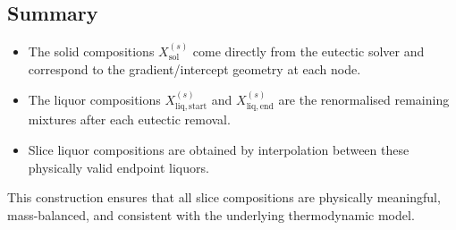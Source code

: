 \subsection{Summary}

\begin{itemize}
    \item The solid compositions $X^{(s)}_{\mathrm{sol}}$ come directly from the
          eutectic solver and correspond to the gradient/intercept geometry at
          each node.
    \item The liquor compositions $X^{(s)}_{\mathrm{liq,start}}$ and
          $X^{(s)}_{\mathrm{liq,end}}$ are the renormalised remaining mixtures
          after each eutectic removal.
    \item Slice liquor compositions are obtained by interpolation between these
          physically valid endpoint liquors.
\end{itemize}

This construction ensures that all slice compositions are physically meaningful,
mass-balanced, and consistent with the underlying thermodynamic model.
